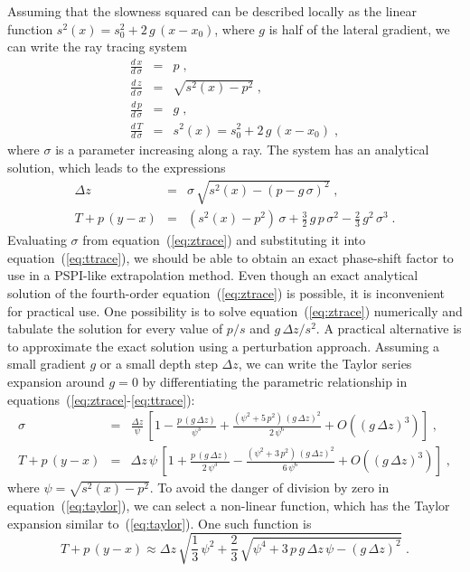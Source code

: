 Assuming that the slowness squared can be described locally as the linear 
function $s^2(x) = s_0^2 + 2\,g\,(x-x_0)$, where $g$ is half of the lateral
gradient, we can write the ray tracing system \cite[]{cerveny}
\begin{eqnarray}
  \label{eq:xray}
  \frac{d\,x}{d\,\sigma} & = & p\;, \\
  \label{eq:zray}
  \frac{d\,z}{d\,\sigma} & = & \sqrt{s^2(x)-p^2}\;, \\
  \label{eq:pray}
  \frac{d\,p}{d\,\sigma} & = & g\;, \\
  \label{eq:tray}
  \frac{d\,T}{d\,\sigma} & = & s^2(x) = s_0^2 + 2\,g\,(x-x_0)\;,
\end{eqnarray}
where $\sigma$ is a parameter increasing along a ray. The system has an
analytical solution, which leads to the expressions
\begin{eqnarray}
  \label{eq:ztrace}
  \Delta z & = & \sigma\,\sqrt{s^2(x) - (p - g\,\sigma)^2}\;, \\
  \label{eq:ttrace}
  T + p\,(y-x) & = & \left(s^2(x) - p^2\right)\,\sigma
    + \frac{3}{2}\,g\,p\,\sigma^2 - \frac{2}{3}\,g^2\,\sigma^3\;.
\end{eqnarray}
Evaluating $\sigma$ from equation~(\ref{eq:ztrace}) and substituting it into
equation~(\ref{eq:ttrace}), we should be able to obtain an exact phase-shift
factor to use in a PSPI-like extrapolation method. Even though an exact
analytical solution of the fourth-order equation~(\ref{eq:ztrace}) is
possible, it is inconvenient for practical use. One possibility is to solve
equation~(\ref{eq:ztrace}) numerically and tabulate the solution for every
value of $p/s$ and $g\,\Delta z/s^2$. A practical alternative is to
approximate the exact solution using a perturbation approach. Assuming a small
gradient $g$ or a small depth step $\Delta z$, we can write the Taylor series
expansion around $g=0$ by differentiating the parametric relationship in
equations~(\ref{eq:ztrace}-\ref{eq:ttrace}):
\begin{eqnarray}
  \label{eq:staylor}
  \sigma & = & \frac{\Delta z}{\psi}\,
  \left[1 - \frac{p\,(g\,\Delta z)}{\psi^3} + 
    \frac{\left(\psi^2+5\,p^2\right)\,(g\,\Delta z)^2}
    {2\,\psi^6} + O\left((g\,\Delta z)^3\right)\right]\;, \\
  \label{eq:taylor}
  T + p\,(y-x) & = & \Delta z\,\psi\,\left[1
  + \frac{p\,(g\,\Delta z)}{2\,\psi^3} 
  - \frac{\left(\psi^2+3\,p^2\right)\,(g\,\Delta z)^2}
  {6\,\psi^6} + O\left((g\,\Delta z)^3\right)\right]\;,
\end{eqnarray}
where $\psi = \sqrt{s^2(x)-p^2}$.
To avoid the danger of division by zero in equation~(\ref{eq:taylor}), we can
select a non-linear function, which has the Taylor expansion similar
to~(\ref{eq:taylor}). One such function is
\begin{equation}
  \label{eq:pspix}
  T + p\,(y-x) \approx
  \Delta z\,\sqrt{\frac{1}{3}\,\psi^2+
    \frac{2}{3}\,\sqrt{\psi^4+
      3\,p\,g\,\Delta z\,\psi - \left(g\,\Delta z\right)^2}}\;.
\end{equation}

